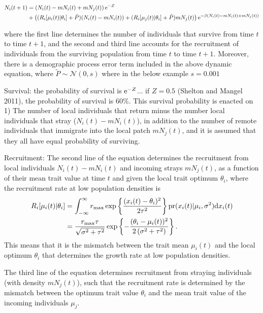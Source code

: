 \documentclass[onecolumn,preprintnumbers,amsmath,amssymb,superscriptaddress]{revtex4}
\begin{document}
\begin{align}
  N_i(t+1) &= \left(N_i(t) - m N_i(t) + m N_j(t) \right){\rm e}^{-Z} \\ \nonumber
  &+ \left((R_i[\mu_i(t)|\theta_i]+\tilde{P}) (N_i(t) - m N_i(t))+ (R_i[\mu_j(t)|\theta_i]+\tilde{P}) m N_j(t)\right) {\rm e}^{-\beta (N_i(t) - m N_i(t)+ m N_j(t))}
\end{align}

\noindent where the first line determines the number of individuals that survive from time $t$ to time $t+1$, and the second and third line accounts for the recruitment of individuals from the surviving population from time $t$ to time $t+1$.
Moreover, there is a demographic process error term included in the above dynamic equation, where $\tilde{P}\sim \mathcal{N}(0,s)$ where in the below example $s=0.001$

Survival: the probability of survival is ${\rm e}^{-Z}$... if $Z=0.5$ (Shelton and Mangel 2011), the probability of survival is 60\%. 
This survival probability is enacted on 1) The number of local individuals that return minus the number local individuals that stray ($N_i(t) - mN_i(t)$), in addition to the number of remote individuals that immigrate into the local patch $mN_j(t)$, and it is assumed that they all have equal probability of surviving.

Recruitment: The second line of the equation determines the recruitment from local individuals $N_i(t)-mN_i(t)$ and incoming strays $mN_j(t)$, as a function of their mean trait value at time $t$ and given the local trait optimum $\theta_i$, where the recruitment rate at low population densities is
\begin{align}
  R_i[\mu_i(t)|\theta_i] &= \int_{-\infty}^\infty r_{\rm max}\exp\left\{\frac{(x_i(t)-\theta_i)^2}{2\tau^2}\right\} {\rm pr}(x_i(t)|\mu_i,\sigma^2) {\rm d}x_i(t) \\ \nonumber
  &= \frac{r_{\rm max} \tau  }{\sqrt{\sigma ^2+\tau ^2}}\exp\left\{-\frac{(\theta_i-\mu_i(t))^2}{2 \left(\sigma ^2+\tau ^2\right)}\right\}.
\end{align}
This means that it is the mismatch between the trait mean $\mu_i(t)$ and the local optimum $\theta_i$ that determines the  growth rate at low population densities.

The third line of the equation determines recruitment from straying individuals (with density $mN_j(t)$), such that the recruitment rate is determined by the mismatch between the optimum trait value $\theta_i$ and the mean trait value of the incoming individuals $\mu_j$.
\end{document}
